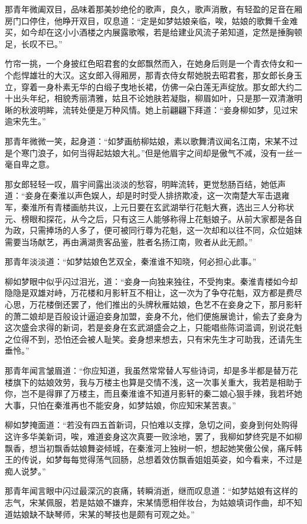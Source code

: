 那青年微阖双目，品味着那美妙绝伦的歌声，良久，歌声消散，有轻盈的足音在厢房门口停住，他睁开双目，叹息道：“定是如梦姑娘亲临，唉，姑娘的歌舞千金难买，如今却在这小小酒楼之内展露歌喉，若是给建业风流子弟知道，定然是捶胸顿足，长叹不已。”

竹帘一挑，一个身披红色昭君套的女郎飘然而入，在她身后则是一个青衣侍女和一个彪悍雄壮的大汉。这女郎入得厢房，那青衣侍女帮她脱去昭君套，那女郎长身玉立，穿着一身朴素无华的白缎子曳地长裙，仿佛一朵白莲无声绽放。那女郎大约二十出头年纪，相貌秀丽清雅，姑且不论她肤若凝脂，柳眉如叶，只是那一双清澈明晰的秋波明眸，流转处便是万种风情。她上前翩翩下拜道：“妾身柳如梦，见过宋逾宋先生。”

那青年微微一笑，起身道：“如梦画舫柳姑娘，素以歌舞清议闻名江南，宋某不过是个寒门浪子，如何当得起姑娘大礼。”但是他眉宇之间却是傲气不减，没有一丝一毫自卑之意。

那女郎轻轻一叹，眉宇间露出淡淡的愁容，明眸流转，更觉愁肠百结，她低声道：“妾身在秦淮以声色娱人，却是时时受人排挤欺凌，这一次南楚大军击退雍军，秦淮所有青楼画舫共议，上元日要在玄武湖举行花魁大赛，选出三人分称状元、榜眼和探花，从今之后，只有这三人能够称得上花魁娘子。从前大家都是各自为政，只需捧场的人多了，便可被同行尊为花魁，这一次却和以往不同，众位姐妹需要当场献艺，再由满湖贵客品鉴，胜者名扬江南，败者从此无颜。”

那青年淡淡道：“如梦姑娘色艺双全，秦淮谁不知晓，何必担心此事。”

柳如梦眼中似乎闪过泪光，道：“妾身一向独来独往，不受拘束。秦淮青楼如今却隐隐是双雄对峙，万花楼和月影轩互不相让，这一次为了争夺花魁，双方都是费尽心思，万花楼倒还罢了，他们推出的头牌秋雁姑娘，色艺不在妾身之下，那月影轩的萧二娘却是百般设计逼迫妾身加盟，妾身不允，他们便施展诡计，偷去了妾身为这次盛会求得的新词，若是妾身在玄武湖盛会之上，只能唱些陈词滥调，别说花魁之位得不到，恐怕还会被人耻笑。妾身想来想去，只有宋先生才可助我，还请先生垂怜。”

那青年闻言皱眉道：“你应知道，我虽然常常替人写些诗词，却是多半都是替万花楼旗下的姑娘效劳，我与万楼主也算是交情不浅，这一次事关重大，我若是相助于你，岂不是得罪了万楼主，而且秦淮谁不知道月影轩的秦二娘心狠手辣，我若坏她大事，只怕在秦淮再也不能安身，如梦姑娘，你应知宋某苦衷。”

柳如梦掩面道：“若没有四五首新词，只怕难以支撑，急切之间，妾身到何处购得这许多华美新词，唉，难道妾身这次真要一败涂地，罢了，我柳如梦终究是不如柳飘香，想当初飘香姑娘舞姿倾城，在秦淮河上独树一帜，想起她笑傲公侯，痛斥韩王的传说，如梦每每觉得荡气回肠，总想着效仿飘香姐姐英姿，如今看来，不过是痴人说梦。”

那青年闻言眼中闪过最深沉的哀痛，转瞬消逝，继而叹息道：“如梦姑娘有这样的志气，宋某佩服，若是姑娘不嫌弃，宋某情愿相伴妆台，为姑娘填词作曲，却不知道姑娘缺不缺琴师，宋某的琴技也是颇有可观之处。”


